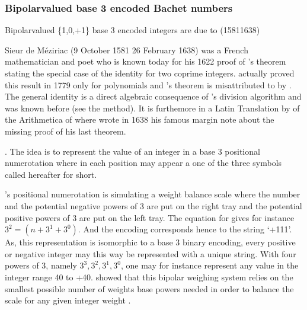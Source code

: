 \documentclass[a4paper,12pt,english]{sphinxhowto}
\begin{document}
\subsubsection{Bipolar\sphinxhyphen{}valued base 3 encoded Bachet numbers}
\label{\detokenize{pearls:bipolar-valued-base-3-encoded-bachet-numbers}}
\sphinxAtStartPar
Bipolar\sphinxhyphen{}valued \{\sphinxhyphen{}1,0,+1\} base 3 encoded integers are due to  (1581\sphinxhyphen{}1638) %
\begin{footnote}[20]\sphinxAtStartFootnote
{}  Sieur de Méziriac (9 October 1581 \textendash{} 26 February 1638) was a French mathematician and poet who is known today for his 1622 proof of ’s theorem stating the special case of the  identity for two coprime integers.  actually proved this result in 1779 only for polynomials and ’s theorem is misattributed to  by . The general  identity is a direct algebraic consequence of ’s division algorithm and was known before  (see the  method). It is furthemore in a Latin Translation by  of the Arithmetica of  where  wrote in 1638 his famous margin note about the missing proof of his last theorem.
%
\end{footnote}. The idea is to represent the value of an integer  in a base 3 positional numerotation where in each position may appear a  \textendash{}one of the three symbols \textendash{} called hereafter  for short.

\sphinxAtStartPar
{}’s positional  numerotation is simulating a weight balance scale where the number  and the potential negative powers of 3 are put on the right tray and the potential positive powers of 3 are put on the left tray. The equation for  gives for instance \(3^2 = (n + 3^1 + 3^0)\). And the  encoding corresponds hence to the string ‘+1\sphinxhyphen{}1\sphinxhyphen{}1’. As, this representation is isomorphic to a base 3 binary encoding, every positive or negative integer may this way be represented with a unique  string. With four powers of 3, namely \({3^3, 3^2, 3^1, 3^0}\), one may for instance represent any value in the integer range \sphinxhyphen{}40 to +40.  showed that this bipolar weighing system relies on the smallest possible number of weights \sphinxhyphen{}base powers\sphinxhyphen{} needed in order to balance the scale for any given integer weight  .
\end{document}
